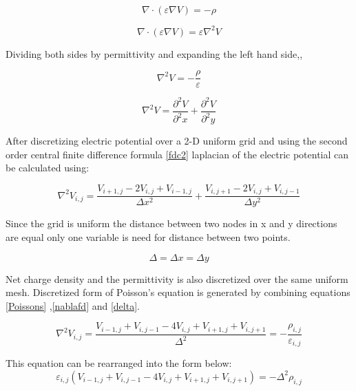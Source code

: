 \begin{doublespace}
\begin{equation}
\nabla \cdot  (\varepsilon \nabla V)=-\rho
\end{equation}

\begin{equation}
\nabla \cdot  (\varepsilon \nabla V)=\varepsilon  \nabla^2 V
\end{equation}

Dividing both sides by permittivity and expanding the left hand side,,

\begin{equation}
 \nabla^2 V =-\frac{\rho}{\varepsilon}
 \label{Poissons}
\end{equation}

\begin{equation}
 \nabla^2 V =\frac{\partial^2 V}{\partial^2 x}+\frac{\partial^2 V}{\partial^2 y}
\end{equation}

After discretizing electric potential over a 2-D uniform grid and using the second order central finite difference formula \eqref{fdc2} laplacian of the electric potential can be calculated using:

\begin{equation}
 \nabla^2 V_{i,j}=\frac{V_{i+1,j}-2V_{i,j}+V_{i-1,j}}{\Delta x^2}+\frac{V_{i,j+1}-2V_{i,j}+V_{i,j-1}}{\Delta y^2}
 \label{nablafd}
\end{equation}

Since the grid is uniform the distance between two nodes in x and y directions are equal only one variable is need for distance between two points.

\begin{equation}
\Delta=\Delta x =\Delta y
\label{delta}
\end{equation}

Net charge density and the permittivity is also discretized over the same uniform mesh. Discretized form of Poisson's equation is generated by combining equations \ref{Poissons} ,\ref{nablafd} and \ref{delta}.

\begin{equation}
 \nabla^2 V_{i,j}=\frac{V_{i-1,j}+V_{i,j-1}-4V_{i,j}+V_{i+1,j}+V_{i,j+1}}{\Delta^2}=-\frac{\rho_{i,j}}{\varepsilon_{i,j}}
\end{equation}

This equation can be rearranged into the form below:
\begin{equation}
\varepsilon_{i,j}(V_{i-1,j}+V_{i,j-1}-4V_{i,j}+V_{i+1,j}+V_{i,j+1})=-\Delta^2\rho_{i,j}
\label{discrete_poisson}
\end{equation}


\end{doublespace}
